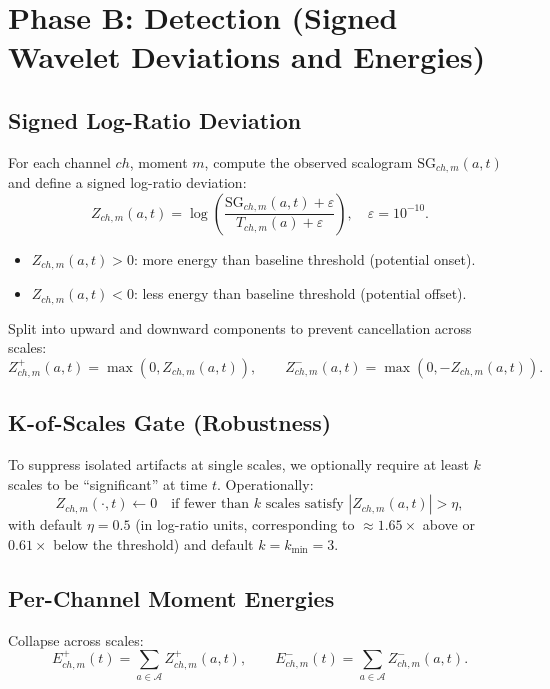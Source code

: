 \documentclass{article}
\begin{document}
\section{Phase B: Detection (Signed Wavelet Deviations and Energies)}
\label{sec:detection}

\subsection{Signed Log-Ratio Deviation}
For each channel $ch$, moment $m$, compute the observed scalogram $\mathrm{SG}_{ch,m}(a,t)$ and
define a signed log-ratio deviation:
\[
Z_{ch,m}(a,t) = \log\!\left(\frac{\mathrm{SG}_{ch,m}(a,t)+\varepsilon}{T_{ch,m}(a)+\varepsilon}\right),
\quad \varepsilon = 10^{-10}.
\]
\begin{itemize}
  \item $Z_{ch,m}(a,t) > 0$: more energy than baseline threshold (potential onset).
  \item $Z_{ch,m}(a,t) < 0$: less energy than baseline threshold (potential offset).
\end{itemize}

Split into upward and downward components to prevent cancellation across scales:
\[
Z^{+}_{ch,m}(a,t) = \max(0, Z_{ch,m}(a,t)),\qquad
Z^{-}_{ch,m}(a,t) = \max(0, -Z_{ch,m}(a,t)).
\]

\subsection{K-of-Scales Gate (Robustness)}
To suppress isolated artifacts at single scales, we optionally require at least $k$ scales to be
``significant'' at time $t$. Operationally:
\[
Z_{ch,m}(\cdot,t) \leftarrow 0 \quad \text{if fewer than } k \text{ scales satisfy } |Z_{ch,m}(a,t)| > \eta,
\]
with default $\eta = 0.5$ (in log-ratio units, corresponding to $\approx 1.65\times$ above or
$0.61\times$ below the threshold) and default $k = k_{\min} = 3$.

\subsection{Per-Channel Moment Energies}
Collapse across scales:
\[
E^{+}_{ch,m}(t) = \sum_{a\in\mathcal{A}} Z^{+}_{ch,m}(a,t),\qquad
E^{-}_{ch,m}(t) = \sum_{a\in\mathcal{A}} Z^{-}_{ch,m}(a,t).
\]
\end{document}

